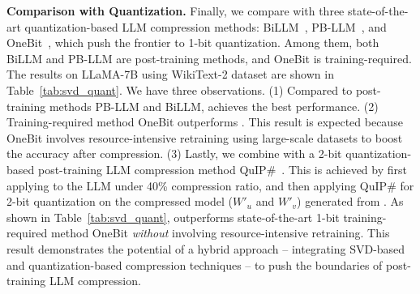 \vspace{-0mm}
\textbf{Comparison with Quantization.} Finally, we compare \sysname with three state-of-the-art quantization-based LLM compression methods: BiLLM~\citep{DBLP:conf/icml/HuangLQLZ0M024}, PB-LLM~\citep{DBLP:conf/iclr/YuanSD24}, and OneBit~\citep{DBLP:conf/nips/Xu0YWZLLC24}, which push the frontier to 1-bit quantization. 
%
Among them, both BiLLM and PB-LLM are post-training methods, and OneBit is training-required. 
%
The results on LLaMA-7B using WikiText-2 dataset are shown in Table~\ref{tab:svd_quant}. 
%
We have three observations. 
%
(1) Compared to post-training methods PB-LLM and BiLLM, \sysname achieves the best performance. 
%
(2) Training-required method OneBit outperforms \sysname. This result is expected because OneBit involves resource-intensive retraining using large-scale datasets to boost the accuracy after compression. %
%
(3) Lastly, we combine \sysname with a 2-bit quantization-based post-training LLM compression method QuIP\#~\citep{DBLP:conf/icml/TsengCSKS24}. This is achieved by first applying \sysname to the LLM under 40\% compression ratio, and then applying QuIP\# for 2-bit quantization on the compressed model ($W'_u$ and $W'_v$) generated from \sysname. As shown in Table~\ref{tab:svd_quant}, \sysname outperforms state-of-the-art 1-bit training-required method OneBit \textit{without} involving resource-intensive retraining. This result demonstrates the potential of a hybrid approach -- integrating SVD-based and quantization-based compression techniques -- to push the boundaries of post-training LLM compression.


%

